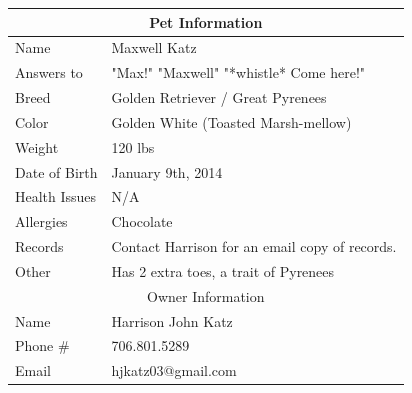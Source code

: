 \documentclass[pdftex,12pt]{article}
\begin{document}
\begin{table}[H]
    \begin{longtable}{@{}ll@{}}
        \toprule
        \multicolumn{2}{c}{Pet Information}                                                                                    \\ \midrule
        Name          & Maxwell Katz                                                                                           \\
        Answers to    & "Max!" "Maxwell" "*whistle* Come here!"                                                                \\
        Breed         & Golden Retriever / Great Pyrenees                                                                      \\
        Color         & Golden White (Toasted Marsh-mellow)                                                                    \\
        Weight        & 120 lbs                                                                                                \\
        Date of Birth & January 9th, 2014                                                                                      \\
        Health Issues & N/A                                                                                                    \\
        Allergies     & Chocolate                                                                                              \\
        Records       & Contact Harrison for an email copy of records.                                                         \\
        Other         & Has 2 extra toes, a trait of Pyrenees                                                                  \\ \midrule
        \multicolumn{2}{c}{Owner Information}                                                                                  \\ \midrule
        Name          & Harrison John Katz                                                                                     \\
        Phone \#      & 706.801.5289                                                                                           \\
        Email         & hjkatz03@gmail.com                                                                                     \\ \midrule

\end{longtable}
\end{table}
\end{document}
